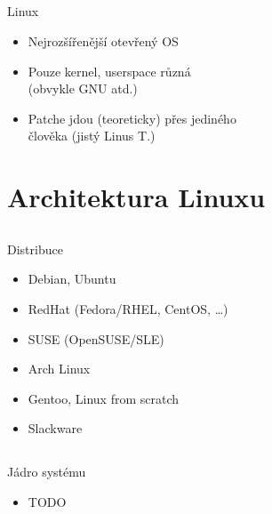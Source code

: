 \documentclass{beamer}
\begin{document}
\subsection{}
\begin{frame}{Linux}
\begin{itemize}
\item Nejrozšířenější otevřený OS
\item Pouze kernel, userspace různá \\ (obvykle GNU atd.)
\item Patche jdou (teoreticky) přes jediného \\ člověka (jistý Linus T.)
\end{itemize}
\end{frame}


\section{Architektura Linuxu}

\subsection{}
\begin{frame}{Distribuce}
\begin{itemize}
\item Debian, Ubuntu
\item RedHat (Fedora/RHEL, CentOS, \dots)
\item SUSE (OpenSUSE/SLE)
\item Arch Linux
\item Gentoo, Linux from scratch
\item Slackware
\end{itemize}
\end{frame}

\subsection{}
\begin{frame}{Jádro systému}
\begin{itemize}
\item TODO
\end{itemize}
\end{frame}
\end{document}
